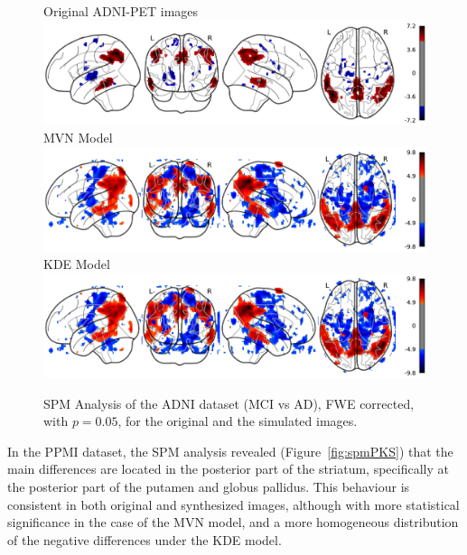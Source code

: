 \begin{figure}
	\centering
	Original ADNI-PET images\\
	\includegraphics[width=\linewidth]{Graphics/ch8/MCIvsAD_Orig_glass}\\
	\ac{MVN} Model\\
	\includegraphics[width=\linewidth]{Graphics/ch8/MCIvsAD_MVN_glass}\\
	\ac{KDE} Model\\
	\includegraphics[width=\linewidth]{Graphics/ch8/MCIvsAD_KDE_glass}
	\caption[\acs{SPM} Analysis of the ADNI dataset (\acs{MCI} vs \acs{AD}).]{\ac{SPM} Analysis of the ADNI dataset (\ac{MCI} vs \ac{AD}), \ac{FWE} corrected, with $p=0.05$, for the original and the simulated images.}
	\label{fig:spmMCIvsAD}
\end{figure}

In the PPMI dataset, the \ac{SPM} analysis revealed (Figure~\ref{fig:spmPKS}) that the main differences are located in the posterior part of the striatum, specifically at the posterior part of the putamen and globus pallidus. This behaviour is consistent in both original and synthesized images, although with more statistical significance in the case of the \ac{MVN} model, and a more homogeneous distribution of the negative differences under the \ac{KDE} model. 


